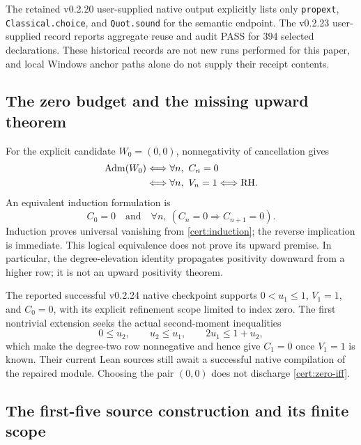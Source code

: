 \documentclass[11pt,a4paper]{article}
\numberwithin{equation}{section}
\theoremstyle{definition}
\theoremstyle{remark}
\newcommand{\RH}{\mathrm{RH}}
\begin{document}
The retained v0.2.20 user-supplied native output explicitly lists only
\texttt{propext}, \texttt{Classical.choice}, and \texttt{Quot.sound} for
the semantic endpoint. The v0.2.23 user-supplied record reports aggregate
reuse and audit PASS for 394 selected declarations. These historical
records are not new runs performed for this paper, and local Windows
anchor paths alone do not supply their receipt contents.

\subsection{The zero budget and the missing upward theorem}

For the explicit candidate $W_0=(0,0)$, nonnegativity of cancellation gives
\begin{align}
\operatorname{Adm}(W_0)
&\Longleftrightarrow\forall n,\ C_n=0\notag\\
&\Longleftrightarrow\forall n,\ V_n=1
\Longleftrightarrow\RH.\label{cert:zero-iff}
\end{align}
An equivalent induction formulation is
\begin{equation}\label{cert:induction}
C_0=0\quad\text{and}\quad
\forall n,\ (C_n=0\Longrightarrow C_{n+1}=0).
\end{equation}
Induction proves universal vanishing from \eqref{cert:induction}; the
reverse implication is immediate. This logical equivalence does not
prove its upward premise. In particular, the degree-elevation identity
propagates positivity downward from a higher row; it is not an upward
positivity theorem.

The reported successful v0.2.24 native checkpoint supports
$0<u_1\le1$, $V_1=1$, and $C_0=0$, with its explicit refinement scope
limited to index zero. The first nontrivial extension seeks the actual
second-moment inequalities
\begin{equation}\label{cert:second-moment}
0\le u_2,\qquad u_2\le u_1,\qquad 2u_1\le1+u_2,
\end{equation}
which make the degree-two row nonnegative and hence give $C_1=0$ once
$V_1=1$ is known. Their current Lean sources still await a successful
native compilation of the repaired module. Choosing the pair $(0,0)$
does not discharge \eqref{cert:zero-iff}.

\subsection{The first-five source construction and its finite scope}
\end{document}
